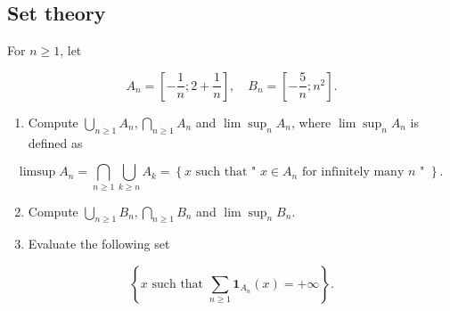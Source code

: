 \begin{center}
    \section*{Set theory}
\end{center}

\begin{Exercise}
For $n \geq 1$, let

$$
A_{n}=\left[-\frac{1}{n} ; 2+\frac{1}{n}\right], \quad B_{n}=\left[-\frac{5}{n} ; n^{2}\right] .
$$

\begin{enumerate}
  \item Compute $\bigcup_{n \geq 1} A_{n}, \bigcap_{n \geq 1} A_{n}$ and $\lim \sup _{n} A_{n}$, where $\lim \sup _{n} A_{n}$ is defined as
\end{enumerate}

$$
\limsup A_{n}=\bigcap_{n \geq 1} \bigcup_{k \geq n} A_{k}=\left\{x \text { such that " } x \in A_{n} \text { for infinitely many } n \text { " }\right\} \text {. }
$$

\begin{enumerate}
  \setcounter{enumi}{1}
  \item Compute $\bigcup_{n \geq 1} B_{n}, \bigcap_{n \geq 1} B_{n}$ and $\lim \sup _{n} B_{n}$.

  \item Evaluate the following set

\end{enumerate}

$$
\left\{x \text { such that } \sum_{n \geq 1} \mathbf{1}_{A_{n}}(x)=+\infty\right\} .
$$
\end{Exercise}